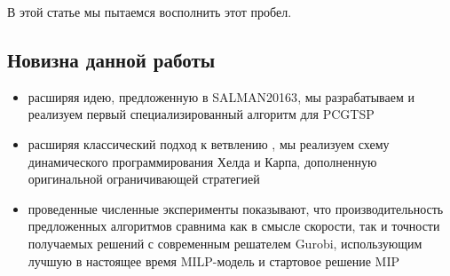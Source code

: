 В этой статье мы пытаемся восполнить этот пробел.

\subsection{Новизна данной работы}
\begin{itemize}
	\item
	расширяя идею, предложенную в {SALMAN20163},
	мы разрабатываем и реализуем первый специализированный алгоритм для PCGTSP
	\item
	расширяя классический подход к ветвлению \cite{MorinMarsten1976},
	мы реализуем схему динамического программирования Хелда и Карпа,
	дополненную оригинальной ограничивающей стратегией
	\item
	проведенные численные эксперименты показывают,
  что производительность предложенных алгоритмов
  сравнима как в смысле скорости, так и точности получаемых решений
  с современным решателем Gurobi,
  использующим лучшую в настоящее время MILP-модель
  и стартовое решение MIP

\end{itemize}
